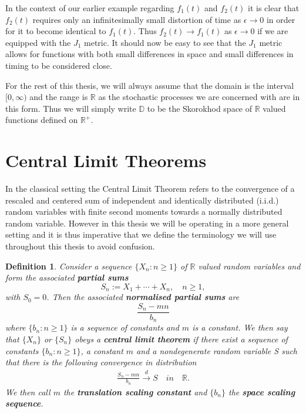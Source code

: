 \documentclass[honours,12pt,twoside, openright]{unswthesis}
\newcommand{\R}{\mathbb{R}}
\newcommand{\Rp}{\mathbb R^+}
\newcommand{\1}{\mathbf 1}
\newcommand{\cd}{\overset{d}{\longrightarrow}}
\newcommand{\D}{\mathbb{D}}
\newtheorem{definition}[equation]{Definition}
\numberwithin{equation}{section}
\theoremstyle{definition}
\theoremstyle{remark}
\begin{document}
 In the context of our earlier example regarding $f_1(t)$ and $f_2(t)$ it is clear that $f_2(t)$ requires only an infinitesimally small distortion of time as $\epsilon\to0$ in order for it to become identical to $f_1(t)$. Thus $f_2(t)\to f_1(t)$ as $\epsilon\to0$ if we are equipped with the $J_1$ metric. It should now be easy to see that the $J_1$ metric allows for functions with both small differences in space and small differences in timing to be considered close.

For the rest of this thesis, we will always assume that the domain is the interval
$[0,\infty)$ and the range is $\R$ as the stochastic processes we are concerned with are in this form. Thus we will simply write $\D$ to be the Skorokhod space of $\R$ valued functions defined on $\Rp$.

\section{Central Limit Theorems}
In the classical setting the Central Limit Theorem refers to the convergence of a rescaled and centered sum of independent and identically distributed (i.i.d.) random variables with finite second moments towards a normally distributed random variable. However in this thesis we will be operating in a more general setting and it is thus imperative that we define the terminology we will use throughout this thesis to avoid confusion.\\

\begin{definition}
	Consider a sequence $\{X_n:n\geq1\}$ of $\R$ valued random variables and form the associated \textbf{partial sums}
	\[
		S_n:=X_1+\cdots+X_n,\quad n\geq1,
	\]
with $S_0=0$. Then the associated \textbf{normalised partial sums} are
\[
	\frac{S_n-mn}{b_n}
\]
where $\{b_n:n\geq 1\}$ is a sequence of constants and $m$ is a constant. We then say that $\{X_n\}$ or $\{S_n\}$ obeys a \textbf{central limit theorem} if there exist a sequence of constants $\{b_n:n\geq 1\}$, a constant $m$ and a nondegenerate random variable S such that there is the following convergence in distribution
\begin{align}\label{eq:partialSum}
	\frac{S_n-mn}{b_n}\cd S \quad in\quad \R.
\end{align}
We then call $m$ the \textbf{translation scaling constant} and $\{b_n\}$ the \textbf{space scaling sequence}.\\
\end{definition}
\end{document}
